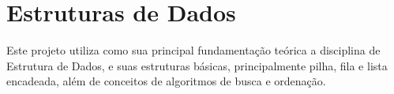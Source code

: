 \section{Estruturas de Dados}

Este projeto utiliza como sua principal fundamentação teórica a disciplina de
Estrutura de Dados, e suas estruturas básicas, principalmente pilha, fila e
lista encadeada, além de conceitos de algoritmos de busca e ordenação.
